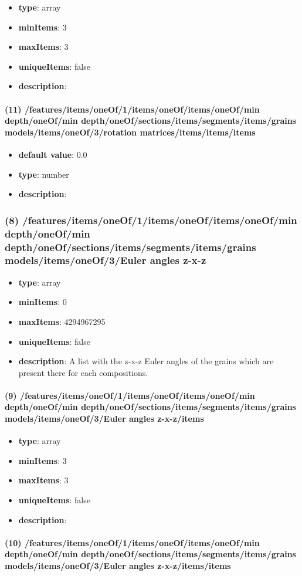 \begin{itemize}[leftmargin=10em]\item {\bf type}: array
\item {\bf minItems}: 3
\item {\bf maxItems}: 3
\item {\bf uniqueItems}: false
\item {\bf description}: 
\end{itemize}\paragraph{(11) /features/items/oneOf/1/items/oneOf/items/oneOf/min depth/oneOf/min depth/oneOf/sections/items/segments/items/grains models/items/oneOf/3/rotation matrices/items/items/items}
\begin{itemize}[leftmargin=11em]\item {\bf default value}: 0.0
\item {\bf type}: number
\item {\bf description}: 
\end{itemize}\subsubsection{(8) /features/items/oneOf/1/items/oneOf/items/oneOf/min depth/oneOf/min depth/oneOf/sections/items/segments/items/grains models/items/oneOf/3/Euler angles z-x-z}
\begin{itemize}[leftmargin=8em]\item {\bf type}: array
\item {\bf minItems}: 0
\item {\bf maxItems}: 4294967295
\item {\bf uniqueItems}: false
\item {\bf description}: A list with the z-x-z Euler angles of the grains which are present there for each compositions.
\end{itemize}\paragraph{(9) /features/items/oneOf/1/items/oneOf/items/oneOf/min depth/oneOf/min depth/oneOf/sections/items/segments/items/grains models/items/oneOf/3/Euler angles z-x-z/items}
\begin{itemize}[leftmargin=9em]\item {\bf type}: array
\item {\bf minItems}: 3
\item {\bf maxItems}: 3
\item {\bf uniqueItems}: false
\item {\bf description}: 
\end{itemize}\paragraph{(10) /features/items/oneOf/1/items/oneOf/items/oneOf/min depth/oneOf/min depth/oneOf/sections/items/segments/items/grains models/items/oneOf/3/Euler angles z-x-z/items/items}

